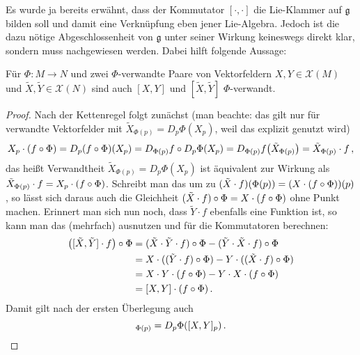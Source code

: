 \documentclass[../H_Analysis_main.tex]{subfiles}
\begin{document}
Es wurde ja bereits erwähnt, dass der Kommutator $[\cdot, \cdot]$ die Lie-Klammer auf $\mathfrak{g}$ bilden soll und damit eine Verknüpfung eben jener Lie-Algebra. Jedoch ist die dazu nötige Abgeschlossenheit von $\mathfrak{g}$ unter seiner Wirkung keineswegs direkt klar, sondern muss nachgewiesen werden. Dabei hilft folgende Aussage:
\begin{lemma}\label{lemma:verwandtkomm}
Für $\Phi: M \rightarrow N$ und zwei $\Phi$-verwandte Paare von Vektorfeldern $X, Y \in \mathcal{X}(M)$ und $\tilde{X}, \tilde{Y} \in \mathcal{X}(N)$ sind auch $[X, Y]$ und $[\tilde{X}, \tilde{Y}]$ $\Phi$-verwandt.
\end{lemma}
\begin{proof}
Nach der Kettenregel folgt zunächst (man beachte: das gilt nur für verwandte Vektorfelder mit $\tilde{X}_{\Phi(p)} = D_p \Phi(X_p)$, weil das explizit genutzt wird)
\begin{equation*}
X_p \cdot \qty(f \circ \Phi) = D_p \qty(f \circ \Phi)(X_p) = D_{\Phi(p)} f \circ D_p \Phi(X_p) = D_{\Phi(p)} f \qty(\tilde{X}_{\Phi(p)}) = \tilde{X}_{\Phi(p)} \cdot f \, ,
\end{equation*}
das heißt Verwandtheit $\tilde{X}_{\Phi(p)} = D_p \Phi(X_p)$ ist äquivalent zur Wirkung als $\tilde{X}_{\Phi(p)} \cdot f = X_p \cdot \qty(f \circ \Phi)$. Schreibt man das um zu $(\tilde{X} \cdot f)\qty(\Phi(p)) = \qty(X \cdot \qty(f \circ \Phi))(p)$, so lässt sich daraus auch die Gleichheit $(\tilde{X} \cdot f) \circ \Phi = X \cdot \qty(f \circ \Phi)$ ohne Punkt machen. Erinnert man sich nun noch, dass $\tilde{Y} \cdot f$ ebenfalls eine Funktion ist, so kann man das (mehrfach) ausnutzen und für die Kommutatoren berechnen:
\begin{align*}
\qty([\tilde{X}, \tilde{Y}] \cdot f) \circ \Phi &= (\tilde{X} \cdot \tilde{Y} \cdot f) \circ \Phi - (\tilde{Y} \cdot \tilde{X} \cdot f) \circ \Phi 
\\
&= X \cdot ((\tilde{Y} \cdot f) \circ \Phi) - Y \cdot ((\tilde{X} \cdot f) \circ \Phi)
\\
&= X \cdot Y \cdot (f \circ \Phi) - Y \cdot X \cdot (f \circ \Phi)
\\
&= [X, Y] \cdot (f \circ \Phi) \, .
\end{align*}
Damit gilt nach der ersten Überlegung auch
\begin{equation*}
[\tilde{X}, \tilde{Y}]_{\Phi(p)} = D_p \Phi\qty([X, Y]_p) \, . \qedhere
\end{equation*}
\end{proof}
\end{document}
